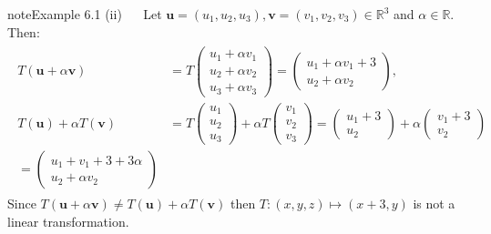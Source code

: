 \documentclass[letterpaper,10pt,english]{jupyterBook}
\begin{document}
\begin{sphinxadmonition}{note}{Example 6.1}
\sphinxAtStartPar
(ii)   Let \(\mathbf{u} = (u_1, u_2, u_3), \mathbf{v} = (v_1, v_2, v_3) \in \mathbb{R}^3\) and \(\alpha \in \mathbb{R}\). Then:
\begin{equation*}
\begin{split} \begin{align*}
    T(\mathbf{u} + \alpha \mathbf{v}) &= T
    \begin{pmatrix} u_1 + \alpha v_1 \\ u_2 + \alpha v_2 \\ u_3 + \alpha v_3 \end{pmatrix}
    = \begin{pmatrix} u_1 + \alpha v_1 + 3 \\ u_2 + \alpha v_2 \end{pmatrix}, \\
    T(\mathbf{u}) + \alpha T(\mathbf{v}) &= T
    \begin{pmatrix} u_1 \\ u_2 \\ u_3 \end{pmatrix} + \alpha T
    \begin{pmatrix} v_1 \\ v_2 \\ v_3 \end{pmatrix} =
    \begin{pmatrix} u_1 + 3 \\ u_2 \end{pmatrix} + \alpha
    \begin{pmatrix} v_1 + 3 \\ v_2 \end{pmatrix} \\
    =
    \begin{pmatrix} u_1 + v_1 + 3 + 3\alpha \\ u_2 + \alpha v_2 \end{pmatrix}
\end{align*} \end{split}
\end{equation*}
\sphinxAtStartPar
Since \(T(\mathbf{u} + \alpha \mathbf{v}) \neq T(\mathbf{u}) + \alpha T(\mathbf{v})\) then \(T: (x, y, z) \mapsto (x + 3, y)\) is not a linear transformation.


\end{sphinxadmonition}
\end{document}
